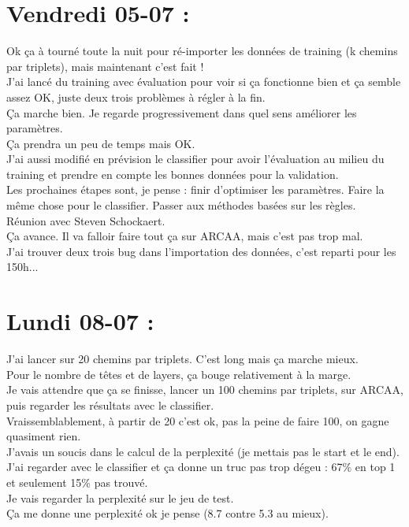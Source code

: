 \documentclass{article}
\begin{document}
\section*{Vendredi 05-07 :}
Ok ça à tourné toute la nuit pour ré-importer les données de training (k chemins par triplets), mais maintenant c'est fait !\\
J'ai lancé du training avec évaluation pour voir si ça fonctionne bien et ça semble assez OK, juste deux trois problèmes à régler à la fin.\\
Ça marche bien. Je regarde progressivement dans quel sens améliorer les paramètres.\\
Ça prendra un peu de temps mais OK.\\
J'ai aussi modifié en prévision le classifier pour avoir l'évaluation au milieu du training et prendre en compte les bonnes données pour la validation.\\
Les prochaines étapes sont, je pense : finir d'optimiser les paramètres. Faire la même chose pour le classifier. Passer aux méthodes basées sur les règles.\\
Réunion avec Steven Schockaert.\\
Ça avance. Il va falloir faire tout ça sur ARCAA, mais c'est pas trop mal.\\
J'ai trouver deux trois bug dans l'importation des données, c'est reparti pour les 150h...\\
\section*{Lundi 08-07 :}
J'ai lancer sur 20 chemins par triplets. C'est long mais ça marche mieux.\\
Pour le nombre de têtes et de layers, ça bouge relativement à la marge.\\
Je vais attendre que ça se finisse, lancer un 100 chemins par triplets, sur ARCAA, puis regarder les résultats avec le classifier.\\
Vraissemblablement, à partir de 20 c'est ok, pas la peine de faire 100, on gagne quasiment rien.\\
J'avais un soucis dans le calcul de la perplexité (je mettais pas le start et le end).\\
J'ai regarder avec le classifier et ça donne un truc pas trop dégeu : 67\% en top 1 et seulement 15\% pas trouvé.\\
Je vais regarder la perplexité sur le jeu de test.\\
Ça me donne une perplexité ok je pense (8.7 contre 5.3 au mieux).\\
\end{document}
